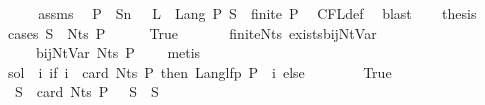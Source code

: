 \begin{isabellebody}
%
\endisadelimproof
%
\isatagproof
{}\isamarkupfalse%
\ {\isacharminus}{\kern0pt}\isanewline
\ \ \isamarkupfalse%
\ assms\ \isamarkupfalse%
\ P\ \ S{\isacharcolon}{\kern0pt}{\isacharcolon}{\kern0pt}{\isacharprime}{\kern0pt}n\ \ {\isacharasterisk}{\kern0pt}{\isacharcolon}{\kern0pt}\ {\isachardoublequoteopen}L\ {\isacharequal}{\kern0pt}\ Lang\ P\ S\ {\isasymand}\ finite\ P{\isachardoublequoteclose}\ \isamarkupfalse%
\ CFL{\isacharunderscore}{\kern0pt}def\ \isamarkupfalse%
\ blast\isanewline
\ \ \isamarkupfalse%
\ {\isacharquery}{\kern0pt}thesis\isanewline
\ \ \isamarkupfalse%
\ {\isacharparenleft}{\kern0pt}cases\ {\isachardoublequoteopen}S\ {\isasymin}\ Nts\ P{\isachardoublequoteclose}{\isacharparenright}{\kern0pt}\isanewline
\ \ \ \ \isamarkupfalse%
\ True\isanewline
\ \ \ \ \isamarkupfalse%
\ {\isacharasterisk}{\kern0pt}\ finite{\isacharunderscore}{\kern0pt}Nts\ exists{\isacharunderscore}{\kern0pt}bij{\isacharunderscore}{\kern0pt}Nt{\isacharunderscore}{\kern0pt}Var\ \isamarkupfalse%
\ {\isasymgamma}\ {\isasymgamma}{\isacharprime}{\kern0pt}\ \ {\isacharasterisk}{\kern0pt}{\isacharasterisk}{\kern0pt}{\isacharcolon}{\kern0pt}\ {\isachardoublequoteopen}bij{\isacharunderscore}{\kern0pt}Nt{\isacharunderscore}{\kern0pt}Var\ {\isacharparenleft}{\kern0pt}Nts\ P{\isacharparenright}{\kern0pt}\ {\isasymgamma}\ {\isasymgamma}{\isacharprime}{\kern0pt}{\isachardoublequoteclose}\ \isamarkupfalse%
\ metis\isanewline
\ \ \ \ \isamarkupfalse%
\ {\isacharquery}{\kern0pt}sol\ {\isacharequal}{\kern0pt}\ {\isachardoublequoteopen}{\isasymlambda}i{\isachardot}{\kern0pt}\ if\ i\ {\isacharless}{\kern0pt}\ card\ {\isacharparenleft}{\kern0pt}Nts\ P{\isacharparenright}{\kern0pt}\ then\ Lang{\isacharunderscore}{\kern0pt}lfp\ P\ {\isacharparenleft}{\kern0pt}{\isasymgamma}\ i{\isacharparenright}{\kern0pt}\ else\ {\isacharbraceleft}{\kern0pt}{\isacharbraceright}{\kern0pt}{\isachardoublequoteclose}\isanewline
\ \ \ \ \isamarkupfalse%
\ {\isacharasterisk}{\kern0pt}{\isacharasterisk}{\kern0pt}\ True\ \isamarkupfalse%
\ {\isachardoublequoteopen}{\isasymgamma}{\isacharprime}{\kern0pt}\ S\ {\isacharless}{\kern0pt}\ card\ {\isacharparenleft}{\kern0pt}Nts\ P{\isacharparenright}{\kern0pt}{\isachardoublequoteclose}\ {\isachardoublequoteopen}{\isasymgamma}\ {\isacharparenleft}{\kern0pt}{\isasymgamma}{\isacharprime}{\kern0pt}\ S{\isacharparenright}{\kern0pt}\ {\isacharequal}{\kern0pt}\ S{\isachardoublequoteclose}\isanewline

\end{isabellebody}
